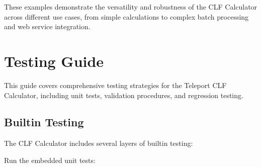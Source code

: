 \documentclass[letterpaper,10pt,english]{sphinxmanual}
\begin{document}
\begin{sphinxVerbatim}[commandchars=\\\{\}]
         
             
             
             

       
           

\end{sphinxVerbatim}

\sphinxAtStartPar
These examples demonstrate the versatility and robustness of the CLF Calculator across different use cases, from simple calculations to complex batch processing and web service integration.

\sphinxstepscope


\section{Testing Guide}
\label{\detokenize{testing:testing-guide}}\label{\detokenize{testing::doc}}
\sphinxAtStartPar
This guide covers comprehensive testing strategies for the Teleport CLF Calculator, including unit tests, validation procedures, and regression testing.


\subsection{Built\sphinxhyphen{}in Testing}
\label{\detokenize{testing:built-in-testing}}
\sphinxAtStartPar
The CLF Calculator includes several layers of built\sphinxhyphen{}in testing:

\sphinxAtStartPar
{}

\sphinxAtStartPar
Run the embedded unit tests:

\begin{sphinxVerbatim}[commandchars=\\\{\}]
  
\end{sphinxVerbatim}
\end{document}
